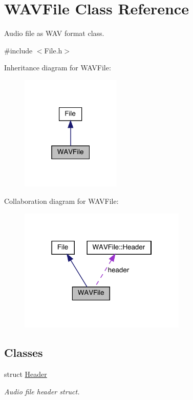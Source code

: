 \hypertarget{class_w_a_v_file}{}\section{W\+A\+V\+File Class Reference}
\label{class_w_a_v_file}


Audio file as W\+AV format class.  




{\ttfamily \#include $<$File.\+h$>$}



Inheritance diagram for W\+A\+V\+File\+:
\nopagebreak
\begin{figure}[H]
\begin{center}
\leavevmode
\includegraphics[width=135pt]{class_w_a_v_file__inherit__graph}
\end{center}
\end{figure}


Collaboration diagram for W\+A\+V\+File\+:
\nopagebreak
\begin{figure}[H]
\begin{center}
\leavevmode
\includegraphics[width=226pt]{class_w_a_v_file__coll__graph}
\end{center}
\end{figure}
\subsection*{Classes}
\begin{DoxyCompactItemize}
\item 
struct \hyperlink{struct_w_a_v_file_1_1_header}{Header}
\begin{DoxyCompactList}\small\item\em Audio file header struct. \end{DoxyCompactList}\end{DoxyCompactItemize}
